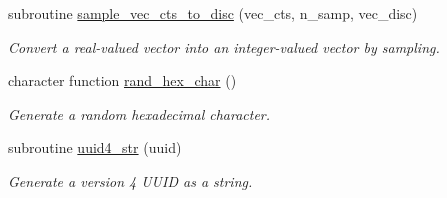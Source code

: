 \begin{DoxyCompactItemize}
subroutine \mbox{\hyperlink{namespacepmc__rand_aae621f54dd9a485ef6dfc472ecc97206}{sample\+\_\+vec\+\_\+cts\+\_\+to\+\_\+disc}} (vec\+\_\+cts, n\+\_\+samp, vec\+\_\+disc)
\begin{DoxyCompactList}\small\item\em Convert a real-\/valued vector into an integer-\/valued vector by sampling. \end{DoxyCompactList}\item 
character function \mbox{\hyperlink{namespacepmc__rand_aa7391b756c870846cb14393a37f095df}{rand\+\_\+hex\+\_\+char}} ()
\begin{DoxyCompactList}\small\item\em Generate a random hexadecimal character. \end{DoxyCompactList}\item 
subroutine \mbox{\hyperlink{namespacepmc__rand_a2412b4291de3a49c6583e04382762cad}{uuid4\+\_\+str}} (uuid)
\begin{DoxyCompactList}\small\item\em Generate a version 4 U\+U\+ID as a string. \end{DoxyCompactList}\end{DoxyCompactItemize}

